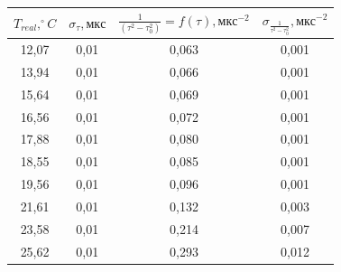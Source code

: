 \begin{table}[hbt]
    \centering
\begin{tabular}{|c|c|c|c|}
\hline
\textbf{$T_{real},   ^\circ C$} & \textbf{$\sigma_{\tau}, мкс$} & \textbf{$\frac{1}{(\tau^2-\tau_0^2)}=f(\tau),   мкс^{-2}$} & \textbf{$\sigma_{\frac{1}{\tau^2-\tau_0^2}},   мкс^{-2}$} \\ \hline
12,07                           & 0,01                          & 0,063                                                      & 0,001                                                      \\ \hline
13,94                           & 0,01                          & 0,066                                                      & 0,001                                                      \\ \hline
15,64                           & 0,01                          & 0,069                                                      & 0,001                                                      \\ \hline
16,56                           & 0,01                          & 0,072                                                      & 0,001                                                      \\ \hline
17,88                           & 0,01                          & 0,080                                                      & 0,001                                                      \\ \hline
18,55                           & 0,01                          & 0,085                                                      & 0,001                                                      \\ \hline
19,56                           & 0,01                          & 0,096                                                      & 0,001                                                      \\ \hline
21,61                           & 0,01                          & 0,132                                                      & 0,003                                                      \\ \hline
23,58                           & 0,01                          & 0,214                                                      & 0,007                                                      \\ \hline
25,62                           & 0,01                          & 0,293                                                      & 0,012                                                      \\ \hline

\end{tabular}
\end{table}
